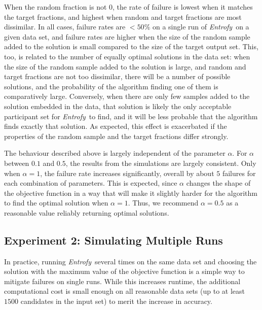 \documentclass[12pt]{article}
\newcommand{\project}[1]{\textsl{#1}}
\newcommand{\entrofy}{\project{Entrofy}}
\begin{document}
When the random fraction is not $0$, the rate of failure is lowest when it matches the target fractions, and highest when random and target fractions are most dissimilar. In all cases, failure rates are $<50\%$ on a single run of \entrofy\ on a given data set, and failure rates are higher when the size of the random sample added to the solution is small compared to the size of the target output set. This, too, is related to the number of equally optimal solutions in the data set: when the size of the random sample added to the solution is large, and random and target fractions are not too dissimilar, there will be a number of possible solutions, and the probability of the algorithm finding one of them is comparatively large. Conversely, when there are only few samples added to the solution embedded in the data, that solution is likely the only acceptable participant set for \entrofy\ to find, and it will be less probable that the algorithm finds exactly that solution. As expected, this effect is exacerbated if the properties of the random sample and the target fractions differ strongly.

The behaviour described above is largely independent of the parameter $\alpha$. For $\alpha$ between $0.1$ and $0.5$, the results from the simulations are largely consistent. Only when $\alpha = 1$, the failure rate increases significantly, overall by about $5$ failures for each combination of parameters. This is expected, since $\alpha$ changes the shape of the objective function in a way that will make it slightly harder for the algorithm to find the optimal solution when $\alpha = 1$. Thus, we recommend $\alpha = 0.5$ as a reasonable value reliably returning optimal solutions.

\subsection*{Experiment 2: Simulating Multiple Runs}
In practice, running \entrofy\ several times on the same data set and choosing the solution with the maximum value of the objective function is a simple way to mitigate failures on single runs. While this increases runtime, the additional computational cost is small enough on all reasonable data sets (up to at least $1500$ candidates in the input set) to merit the increase in accuracy.
\end{document}
